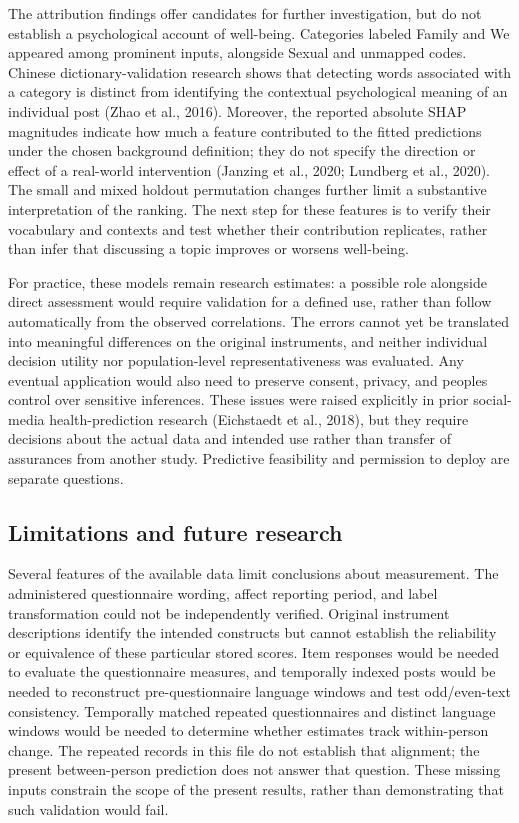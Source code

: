 \documentclass[11pt,letterpaper]{article}
\begin{document}
The attribution findings offer candidates for further investigation, but do not establish a psychological account of well-being. Categories labeled Family and We appeared among prominent inputs, alongside Sexual and unmapped codes. Chinese dictionary-validation research shows that detecting words associated with a category is distinct from identifying the contextual psychological meaning of an individual post (Zhao et al., 2016). Moreover, the reported absolute SHAP magnitudes indicate how much a feature contributed to the fitted predictions under the chosen background definition; they do not specify the direction or effect of a real-world intervention (Janzing et al., 2020; Lundberg et al., 2020). The small and mixed holdout permutation changes further limit a substantive interpretation of the ranking. The next step for these features is to verify their vocabulary and contexts and test whether their contribution replicates, rather than infer that discussing a topic improves or worsens well-being.

For practice, these models remain research estimates: a possible role alongside direct assessment would require validation for a defined use, rather than follow automatically from the observed correlations. The errors cannot yet be translated into meaningful differences on the original instruments, and neither individual decision utility nor population-level representativeness was evaluated. Any eventual application would also need to preserve consent, privacy, and people\textquotesingle s control over sensitive inferences. These issues were raised explicitly in prior social-media health-prediction research (Eichstaedt et al., 2018), but they require decisions about the actual data and intended use rather than transfer of assurances from another study. Predictive feasibility and permission to deploy are separate questions.

\subsection{Limitations and future research}\label{limitations-and-future-research}

Several features of the available data limit conclusions about measurement. The administered questionnaire wording, affect reporting period, and label transformation could not be independently verified. Original instrument descriptions identify the intended constructs but cannot establish the reliability or equivalence of these particular stored scores. Item responses would be needed to evaluate the questionnaire measures, and temporally indexed posts would be needed to reconstruct pre-questionnaire language windows and test odd/even-text consistency. Temporally matched repeated questionnaires and distinct language windows would be needed to determine whether estimates track within-person change. The repeated records in this file do not establish that alignment; the present between-person prediction does not answer that question. These missing inputs constrain the scope of the present results, rather than demonstrating that such validation would fail.
\end{document}
